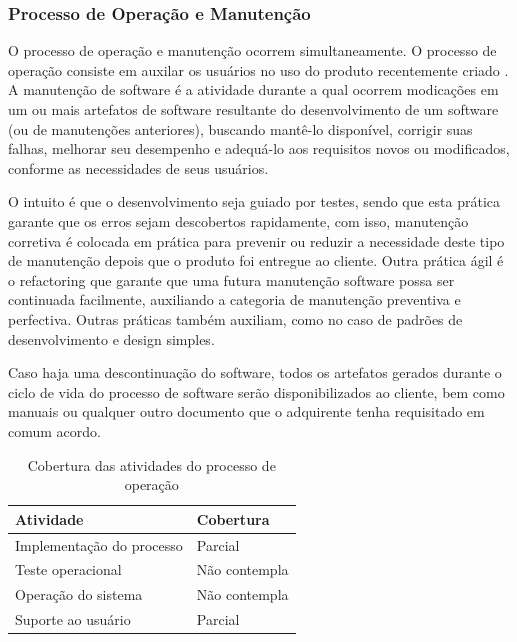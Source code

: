 \subsubsection{\large{Processo de Operação e Manutenção}}
\label{sec:operacao}

O processo de operação e manutenção ocorrem simultaneamente. O processo de operação consiste em auxilar os usuários no uso do produto recentemente criado \cite{iso12207:95}. A manutenção de software é a atividade durante a qual ocorrem modicações em um ou mais artefatos de software resultante do desenvolvimento de um software (ou de manutenções anteriores), buscando mantê-lo disponível, corrigir suas falhas, melhorar seu desempenho e adequá-lo aos requisitos novos ou modificados, conforme as necessidades de seus usuários\cite{IEEE1990}.

O intuito é que o desenvolvimento seja guiado por testes, sendo que esta prática garante que os erros sejam descobertos rapidamente, com isso, manutenção corretiva é colocada em prática para prevenir ou reduzir a necessidade deste tipo de manutenção depois que o produto foi entregue ao cliente.
Outra prática ágil é o refactoring que garante que uma futura manutenção software possa ser continuada facilmente, auxiliando a categoria de manutenção preventiva e perfectiva.
Outras práticas também auxiliam, como no caso de padrões de desenvolvimento e design simples.

Caso haja uma descontinuação do software, todos os artefatos gerados durante o ciclo de vida do processo de software serão disponibilizados ao cliente, bem como manuais ou qualquer outro documento que o adquirente tenha requisitado em comum acordo.

\begin{table}[htb]
      \begin{center}
        \begin{tabular}{| p{6cm} | l |}
        \hline
        \textbf{Atividade} & \textbf{Cobertura} \\ \hline
        Implementação do processo & Parcial \\ \hline
        Teste operacional & Não contempla \\ \hline
        Operação do sistema & Não contempla \\ \hline
        Suporte ao usuário & Parcial \\ \hline
        \end{tabular}
      \end{center}
    \caption{Cobertura das atividades do processo de operação}
    \end{table}

